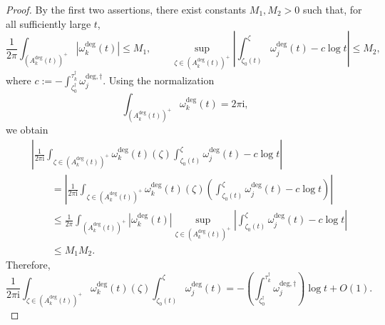 \documentclass[12pt]{amsart}
\numberwithin{equation}{section}
\theoremstyle{definition}
\def\trop{\dagger}
\def\imunit{{\mathrm{i}}}
\def\ptSig{\zeta}
\def\basept{{\ptSig_0}}
\def\baseptT{{\ptSig_0^\trop}}
\begin{document}
\begin{proof}
By the first two assertions, there exist constants $M_1,M_2>0$ such
that, for all sufficiently large $t$,
\[
\frac{1}{2\pi}
\int_{(A_k^{\mathrm{deg}}(t))^+}
\left|
\omega_k^{\mathrm{deg}}(t)
\right|
\leq
M_1,
\qquad
\sup_{\zeta\in(A_k^{\mathrm{deg}}(t))^+}
\left|
\int_{\basept(t)}^\zeta
\omega_j^{\mathrm{deg}}(t)
-
c\log t
\right|
\leq
M_2,
\]
where
$
c
:=
-
\int_{\baseptT}^{\tau_k^\trop}
\omega_j^{\mathrm{deg},\trop}.
$
Using the normalization
\[
\int_{(A_k^{\mathrm{deg}}(t))^+}
\omega_k^{\mathrm{deg}}(t)
=
2\pi\imunit,
\]
we obtain
\begin{align*}
&
\left|
\frac{1}{2\pi\imunit}
\int_{\zeta\in(A_k^{\mathrm{deg}}(t))^+}
\omega_k^{\mathrm{deg}}(t)(\zeta)
\int_{\basept(t)}^\zeta
\omega_j^{\mathrm{deg}}(t)
-
c\log t
\right|
\\
&\qquad=
\left|
\frac{1}{2\pi\imunit}
\int_{\zeta\in(A_k^{\mathrm{deg}}(t))^+}
\omega_k^{\mathrm{deg}}(t)(\zeta)
\left(
\int_{\basept(t)}^\zeta
\omega_j^{\mathrm{deg}}(t)
-
c\log t
\right)
\right|
\\
&\qquad\leq
\frac{1}{2\pi}
\int_{(A_k^{\mathrm{deg}}(t))^+}
\left|
\omega_k^{\mathrm{deg}}(t)
\right|
\sup_{\zeta\in(A_k^{\mathrm{deg}}(t))^+}
\left|
\int_{\basept(t)}^\zeta
\omega_j^{\mathrm{deg}}(t)
-
c\log t
\right|
\\
&\qquad\leq
M_1M_2.
\end{align*}
Therefore,
\[
\frac{1}{2\pi\imunit}
\int_{\zeta\in(A_k^{\mathrm{deg}}(t))^+}
\omega_k^{\mathrm{deg}}(t)(\zeta)
\int_{\basept(t)}^\zeta
\omega_j^{\mathrm{deg}}(t)
=
-
\left(
\int_{\baseptT}^{\tau_k^\trop}
\omega_j^{\mathrm{deg},\trop}
\right)
\log t
+
O(1).
\]
\end{proof}
\end{document}
